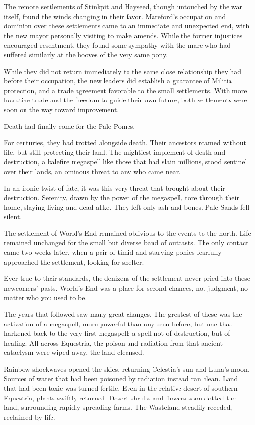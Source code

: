 {\br}%
The remote settlements of Stinkpit and Hayseed, though untouched by the war itself, found the winds changing in their favor. Mareford’s occupation and dominion over these settlements came to an immediate and unexpected end, with the new mayor personally visiting to make amends. While the former injustices encouraged resentment, they found some sympathy with the mare who had suffered similarly at the hooves of the very same pony.

While they did not return immediately to the same close relationship they had before their occupation, the new leaders did establish a guarantee of Militia protection, and a trade agreement favorable to the small settlements. With more lucrative trade and the freedom to guide their own future, both settlements were soon on the way toward improvement.

{\br}%
Death had finally come for the Pale Ponies.

For centuries, they had trotted alongside death. Their ancestors roamed without life, but still protecting their land. The mightiest implement of death and destruction, a balefire megaspell like those that had slain millions, stood sentinel over their lands, an ominous threat to any who came near.

In an ironic twist of fate, it was this very threat that brought about their destruction. Serenity, drawn by the power of the megaspell, tore through their home, slaying living and dead alike. They left only ash and bones. Pale Sands fell silent.

{\br}%
The settlement of World’s End remained oblivious to the events to the north. Life remained unchanged for the small but diverse band of outcasts. The only contact came two weeks later, when a pair of timid and starving ponies fearfully approached the settlement, looking for shelter.

Ever true to their standards, the denizens of the settlement never pried into these newcomers’ pasts. World’s End was a place for second chances, not judgment, no matter who you used to be.

{\br}%
The years that followed saw many great changes. The greatest of these was the activation of a megaspell, more powerful than any seen before, but one that harkened back to the very first megaspell; a spell not of destruction, but of healing. All across Equestria, the poison and radiation from that ancient cataclysm were wiped away, the land cleansed.

Rainbow shockwaves opened the skies, returning Celestia’s sun and Luna’s moon. Sources of water that had been poisoned by radiation instead ran clean. Land that had been toxic was turned fertile. Even in the relative desert of southern Equestria, plants swiftly returned. Desert shrubs and flowers soon dotted the land, surrounding rapidly spreading farms. The Wasteland steadily receded, reclaimed by life.

